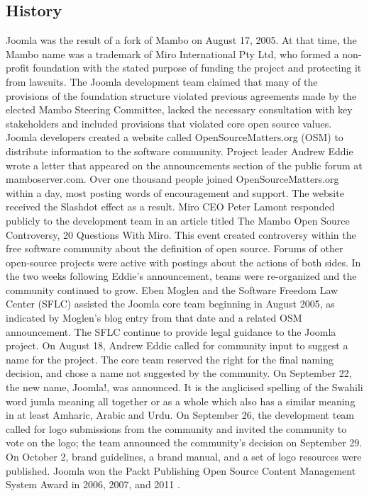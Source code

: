 \subsection{History}
\label{joomla_his}
Joomla was the result of a fork of Mambo on August 17, 2005. At that time, the Mambo name was a trademark of Miro International Pty Ltd, who formed a non-profit foundation with the stated purpose of funding the project and protecting it from lawsuits. The Joomla development team claimed that many of the provisions of the foundation structure violated previous agreements made by the elected Mambo Steering Committee, lacked the necessary consultation with key stakeholders and included provisions that violated core open source values.
Joomla developers created a website called OpenSourceMatters.org (OSM) to distribute information to the software community. Project leader Andrew Eddie wrote a letter that appeared on the announcements section of the public forum at mamboserver.com. Over one thousand people joined OpenSourceMatters.org within a day, most posting words of encouragement and support. The website received the Slashdot effect as a result. Miro CEO Peter Lamont responded publicly to the development team in an article titled The Mambo Open Source Controversy, 20 Questions With Miro. This event created controversy within the free software community about the definition of open source. Forums of other open-source projects were active with postings about the actions of both sides.
In the two weeks following Eddie's announcement, teams were re-organized and the community continued to grow. Eben Moglen and the Software Freedom Law Center (SFLC) assisted the Joomla core team beginning in August 2005, as indicated by Moglen's blog entry from that date and a related OSM announcement. The SFLC continue to provide legal guidance to the Joomla project.
On August 18, Andrew Eddie called for community input to suggest a name for the project. The core team reserved the right for the final naming decision, and chose a name not suggested by the community. On September 22, the new name, Joomla!, was announced. It is the anglicised spelling of the Swahili word jumla meaning all together or as a whole which also has a similar meaning in at least Amharic, Arabic and Urdu. On September 26, the development team called for logo submissions from the community and invited the community to vote on the logo; the team announced the community's decision on September 29. On October 2, brand guidelines, a brand manual, and a set of logo resources were published.
Joomla won the Packt Publishing Open Source Content Management System Award in 2006, 2007, and 2011 \cite{cms_joomla_overview}.


